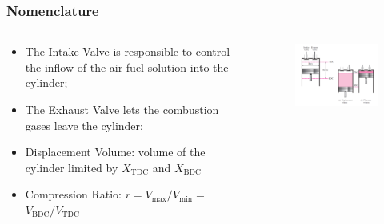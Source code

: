 \documentclass[10pt,compress]{beamer}
\begin{document}
\begin{frame}
 \frametitle{Nomenclature}
 \begin{columns}
  \begin{column}[c]{0.4\linewidth}
   \begin{itemize}
    \item <1-> The Intake Valve is responsible to control the inflow of the air-fuel solution into the cylinder;
    \item <2-> The Exhaust Valve lets the combustion gases leave the cylinder;
    \item <3-> Displacement Volume: volume of the cylinder limited by $X_{\text{TDC}}$ and $X_{\text{BDC}}$ 
    \item <4-> Compression Ratio: $r=V_{\text{max}}/V_{\text{min}}=$ $V_{\text{BDC}}/V_{\text{TDC}}$ 
   \end{itemize}
  \end{column}
  \begin{column}[c]{0.6\linewidth}
   \begin{figure}%
    \begin{center}
     \includegraphics[width=7.5cm,clip]{./Pics/GasCycle_ReciprocatingEngine}
    \end{center}
   \end{figure}  
  \end{column}  
 \end{columns}
\end{frame}
\end{document}
